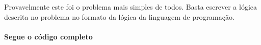 Provavelmente este foi o problema mais simples de todos. Basta escrever a lógica descrita no problema no formato da lógica da linguagem de programação.
\paragraph{Segue o código completo}
\begin{mdframed}[linewidth=0pt,backgroundcolor=codebgcolor]
    \inputminted[breaklines]{python}{../src/nastyhacks/nastyhacks.py}
\end{mdframed}